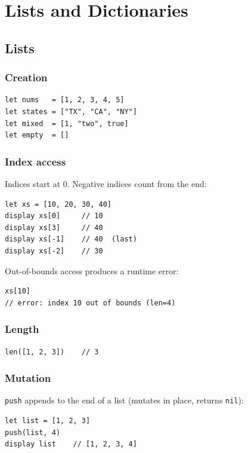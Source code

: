 \chapter{Lists and Dictionaries}

\section{Lists}

\subsection{Creation}

\begin{lstlisting}
let nums   = [1, 2, 3, 4, 5]
let states = ["TX", "CA", "NY"]
let mixed  = [1, "two", true]
let empty  = []
\end{lstlisting}

\subsection{Index access}

Indices start at 0. Negative indices count from the end:

\begin{lstlisting}
let xs = [10, 20, 30, 40]
display xs[0]     // 10
display xs[3]     // 40
display xs[-1]    // 40  (last)
display xs[-2]    // 30
\end{lstlisting}

Out-of-bounds access produces a runtime error:

\begin{lstlisting}
xs[10]
// error: index 10 out of bounds (len=4)
\end{lstlisting}

\subsection{Length}

\begin{lstlisting}
len([1, 2, 3])    // 3
\end{lstlisting}

\subsection{Mutation}

\lstinline{push} appends to the end of a list (mutates in place, returns
\lstinline{nil}):

\begin{lstlisting}
let list = [1, 2, 3]
push(list, 4)
display list    // [1, 2, 3, 4]
\end{lstlisting}

